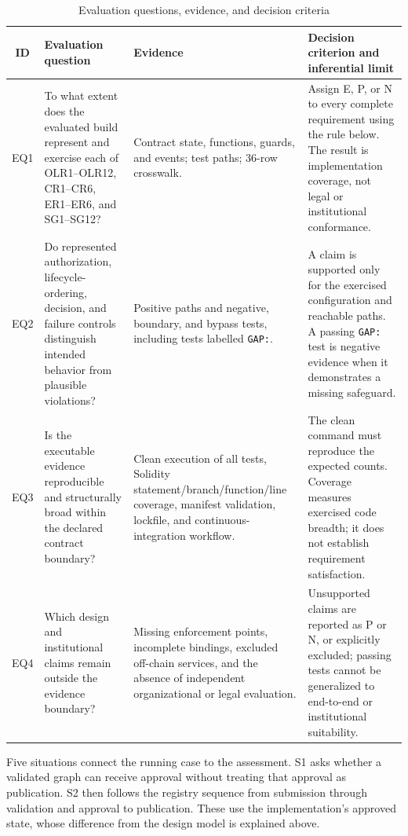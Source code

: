 \documentclass[journal]{IEEEtran}
\begin{document}
\begin{table}[t]
\centering
\caption{Evaluation questions, evidence, and decision criteria}
\label{tab:evaluation_questions}
\renewcommand{\arraystretch}{1.1}
\footnotesize
\begin{tabular}{@{}c p{5.0cm} p{5.2cm} p{5.5cm}@{}}
\toprule
\textbf{ID} & \textbf{Evaluation question} & \textbf{Evidence} & \textbf{Decision criterion and inferential limit} \\
\midrule
EQ1 & To what extent does the evaluated build represent and exercise each of OLR1--OLR12, CR1--CR6, ER1--ER6, and SG1--SG12? & Contract state, functions, guards, and events; test paths; 36-row crosswalk. & Assign E, P, or N to every complete requirement using the rule below. The result is implementation coverage, not legal or institutional conformance. \\
EQ2 & Do represented authorization, lifecycle-ordering, decision, and failure controls distinguish intended behavior from plausible violations? & Positive paths and negative, boundary, and bypass tests, including tests labelled \texttt{GAP:}. & A claim is supported only for the exercised configuration and reachable paths. A passing \texttt{GAP:} test is negative evidence when it demonstrates a missing safeguard. \\
EQ3 & Is the executable evidence reproducible and structurally broad within the declared contract boundary? & Clean execution of all tests, Solidity statement/branch/function/line coverage, manifest validation, lockfile, and continuous-integration workflow. & The clean command must reproduce the expected counts. Coverage measures exercised code breadth; it does not establish requirement satisfaction. \\
EQ4 & Which design and institutional claims remain outside the evidence boundary? & Missing enforcement points, incomplete bindings, excluded off-chain services, and the absence of independent organizational or legal evaluation. & Unsupported claims are reported as P or N, or explicitly excluded; passing tests cannot be generalized to end-to-end or institutional suitability. \\
\bottomrule
\end{tabular}
\end{table}

Five situations connect the running case to the assessment. S1 asks
whether a validated graph can receive approval without treating that
approval as publication. S2 then follows the registry sequence from
submission through validation and approval to publication. These use
the implementation's approved state, whose difference from the design
model is explained above.
\end{document}
